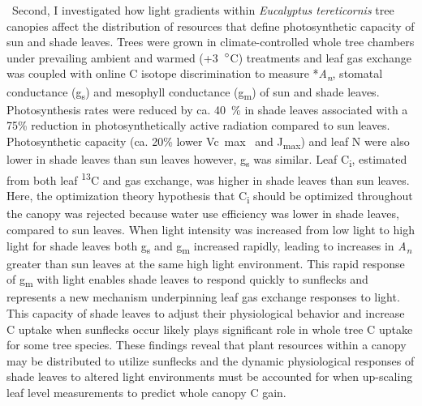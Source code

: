 \documentclass[a4paper]{article}\usepackage[]{graphicx}\usepackage[]{color}
\begin{document}
\
Second, I investigated how light gradients within \textit{Eucalyptus tereticornis} tree canopies affect the distribution of resources that define photosynthetic capacity of sun and shade leaves. Trees were grown in climate-controlled  whole tree chambers under prevailing ambient and warmed (+3~$\degree$C) treatments and leaf gas exchange was coupled with online C isotope discrimination to measure *\textit{A\textsubscript{n}}, stomatal conductance (g\textsubscript{s}) and mesophyll conductance (g\textsubscript{m}) of sun and shade leaves. Photosynthesis rates were reduced by ca. 40~\% in shade leaves associated with a 75\% reduction in photosynthetically active radiation compared to sun leaves. Photosynthetic capacity (ca. 20\% lower Vc~max~ and J\textsubscript{max}) and leaf N were also lower in shade leaves than sun leaves however, g\textsubscript{s} was similar. Leaf C\textsubscript{i}, estimated from both leaf {\textdelta}\textsuperscript{13}C and gas exchange, was higher in shade leaves than sun leaves. Here, the optimization theory hypothesis that C\textsubscript{i} should be optimized throughout the canopy was rejected because water use efficiency was lower in shade leaves, compared to sun leaves. When light intensity was increased from low light to high light for shade leaves both g\textsubscript{s} and g\textsubscript{m} increased rapidly, leading to increases in \textit{A\textsubscript{n}} greater than sun leaves at the same high light environment. This rapid response of g\textsubscript{m} with light enables shade leaves to respond quickly to sunflecks and represents a new mechanism underpinning leaf gas exchange responses to light. This capacity of shade leaves to adjust their physiological behavior and increase C uptake when sunflecks occur likely plays significant role in whole tree C uptake for some tree species. These findings reveal that plant resources within a canopy may be distributed to utilize sunflecks and the dynamic physiological responses of shade leaves to altered light environments must be accounted for when up-scaling leaf level measurements to predict whole canopy C gain. 
\end{document}
